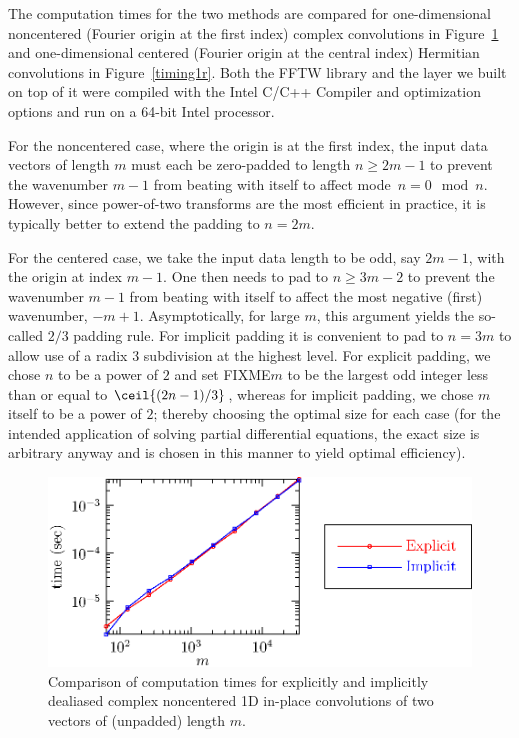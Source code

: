 \documentclass[final]{siamltex}
\begin{document}
The computation times for the two methods are compared for
one-dimensional noncentered (Fourier origin at the first index) complex
convolutions in Figure~\ref{timing1c} and one-dimensional centered (Fourier
origin at the central index) Hermitian convolutions in Figure~\ref{timing1r}.
Both the FFTW library and the layer we built on top of it were compiled
with the Intel C/C++ Compiler and optimization options and run on a 64-bit
Intel processor. 

For the noncentered case, where the origin is at the first index, the input
data vectors of length $m$ must each be zero-padded to length $n\ge 2m-1$ to
prevent the wavenumber $m-1$ from beating with itself to
affect mode~$n=0\mod n$. However, since power-of-two transforms are the most
efficient in practice, it is typically better to extend the padding to $n=2m$.

For the centered case, we take the input data length to be odd, say $2m-1$,
with the origin at index $m-1$. One then needs to pad to $n\ge 3m-2$
to prevent the wavenumber $m-1$ from beating with itself to affect the most
negative (first) wavenumber, $-m+1$. Asymptotically, for large $m$, this
argument yields the so-called $2/3$ padding rule. 
For implicit padding it is convenient to pad to $n=3m$ to allow use of a
radix $3$ subdivision at the highest level. For explicit padding, we chose
$n$ to be a power of $2$ and set FIXME$m$ to be the largest odd integer less than or
equal to $\ceil{(2n-1)/3}$, whereas for implicit padding, we chose $m$ itself
to be a power of $2$; thereby choosing the optimal size for each case
(for the intended application of solving partial differential equations,
the exact size is arbitrary anyway and is chosen in this manner to yield
optimal efficiency). 

\begin{figure}[htbp]
  \begin{center}
    \includegraphics{timing1c}
    \caption{Comparison of computation times for explicitly and implicitly
dealiased complex noncentered 1D in-place convolutions of two vectors of
(unpadded) length $m$.}
    \label{timing1c}
  \end{center}
\end{figure}
\end{document}
